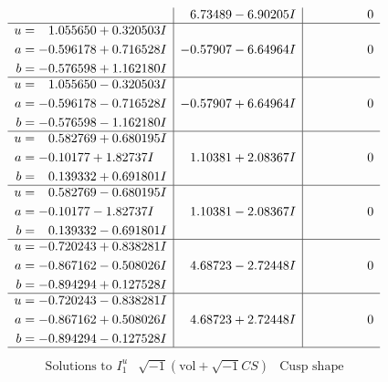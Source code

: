 \documentclass[1p]{elsarticle_modified}
\theoremstyle{definition}
\newcommand{\I}{\sqrt{-1}}
\begin{document}
$$\begin{array}{c|c|c}
 & \phantom{-}6.73489 - 6.90205 I & \phantom{-0.000000 } 0 \\ \hline\begin{aligned}
u &= \phantom{-}1.055650 + 0.320503 I \\
a &= -0.596178 + 0.716528 I \\
b &= -0.576598 + 1.162180 I\end{aligned}
 & -0.57907 - 6.64964 I & \phantom{-0.000000 } 0 \\ \hline\begin{aligned}
u &= \phantom{-}1.055650 - 0.320503 I \\
a &= -0.596178 - 0.716528 I \\
b &= -0.576598 - 1.162180 I\end{aligned}
 & -0.57907 + 6.64964 I & \phantom{-0.000000 } 0 \\ \hline\begin{aligned}
u &= \phantom{-}0.582769 + 0.680195 I \\
a &= -0.10177 + 1.82737 I \\
b &= \phantom{-}0.139332 + 0.691801 I\end{aligned}
 & \phantom{-}1.10381 + 2.08367 I & \phantom{-0.000000 } 0 \\ \hline\begin{aligned}
u &= \phantom{-}0.582769 - 0.680195 I \\
a &= -0.10177 - 1.82737 I \\
b &= \phantom{-}0.139332 - 0.691801 I\end{aligned}
 & \phantom{-}1.10381 - 2.08367 I & \phantom{-0.000000 } 0 \\ \hline\begin{aligned}
u &= -0.720243 + 0.838281 I \\
a &= -0.867162 - 0.508026 I \\
b &= -0.894294 + 0.127528 I\end{aligned}
 & \phantom{-}4.68723 - 2.72448 I & \phantom{-0.000000 } 0 \\ \hline\begin{aligned}
u &= -0.720243 - 0.838281 I \\
a &= -0.867162 + 0.508026 I \\
b &= -0.894294 - 0.127528 I\end{aligned}
 & \phantom{-}4.68723 + 2.72448 I & \phantom{-0.000000 } 0\\
 \hline 
 \end{array}$$\newpage$$\begin{array}{c|c|c}  
\text{Solutions to }I^u_{1}& \I (\text{vol} + \sqrt{-1}CS) & \text{Cusp shape}\\

\end{array}$$
\end{document}
